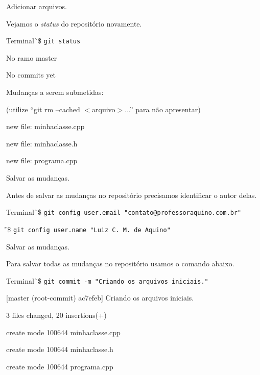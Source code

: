 \documentclass[brazil,aspectratio=169]{beamer}
\newcommand{\terminal}[1]{\textcolor{my-green}{\texttt{#1}}}
\begin{document}
\begin{frame}{Adicionar arquivos.}

Vejamos o \textit{status} do repositório novamente.

\begin{exampleblock}{Terminal}
\~\,\$ \terminal{git status}

No ramo master

No commits yet

Mudanças a serem submetidas:

(utilize ``git rm --cached $<$arquivo$>$...'' para não apresentar)

new file:   minhaclasse.cpp

new file:   minhaclasse.h

new file:   programa.cpp
\end{exampleblock}

\end{frame}

\begin{frame}{Salvar as mudanças.}

  Antes de salvar as mudanças no repositório precisamos identificar o autor delas.

  \begin{exampleblock}{Terminal}
    \~\,\$ \terminal{git config user.email "contato@professoraquino.com.br"}

    \~\,\$ \terminal{git config user.name "Luiz C. M. de Aquino"}
  \end{exampleblock}

\end{frame}

\begin{frame}{Salvar as mudanças.}

Para salvar todas as mudanças no repositório usamos o comando abaixo.

\begin{exampleblock}{Terminal}
\~\,\$ \terminal{git commit -m "Criando os arquivos iniciais."}

[master (root-commit) ac7efeb] Criando os arquivos iniciais.

3 files changed, 20 insertions(+)

create mode 100644 minhaclasse.cpp

create mode 100644 minhaclasse.h

create mode 100644 programa.cpp
 
\end{exampleblock}
\end{frame}
\end{document}
